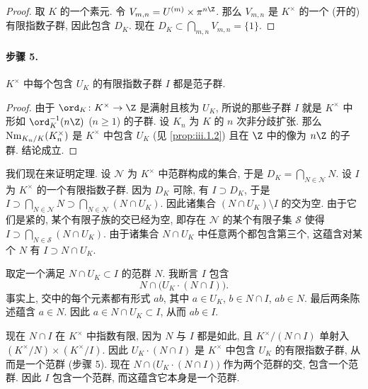 \begin{proof}
取 $K$ 的一个素元. 令 $V_{m,n}=U^{(m)}\times\pi^{n\Z}$. 那么 $V_{m,n}$ 是 $K^\times$ 的一个 (开的) 有限指数子群, 因此包含 $D_K$. 现在 $D_K\subset\bigcap_{m,n}V_{m,n}=\{1\}$.
\end{proof}

\paragraph*{步骤 5.} $K^\times$ 中每个包含 $U_K$ 的有限指数子群 $I$ 都是范子群.

\begin{proof}
由于 $\ord_K\colon K^\times\to\Z$ 是满射且核为 $U_K$, 所说的那些子群 $I$ 就是 $K^\times$ 中形如 $\ord_K^{-1}(n\Z)$ ($n\ge 1$) 的子群. 设 $K_n$ 为 $K$ 的 $n$ 次非分歧扩张. 那么 $\operatorname{Nm}_{K_n/K}(K_n^\times)$ 是 $K^\times$ 中包含 $U_K$ (见 \ref{prop:iii.1.2}) 且在 $\Z$ 中的像为 $n\Z$ 的子群. 结论成立.
\end{proof}

我们现在来证明定理. 设 $\mathcal{N}$ 为 $K^\times$ 中范群构成的集合, 于是 $D_K=\bigcap_{N\in\mathcal{N}}N$. 设 $I$ 为 $K^\times$ 的一个有限指数子群. 因为 $D_K$ 可除, 有 $I\supset D_K$, 于是 $I\supset\bigcap_{N\in\mathcal{N}}N\supset\bigcap_{N\in\mathcal{N}}(N\cap U_K)$. 因此诸集合 $(N\cap U_K)\setminus I$ 的交为空. 由于它们是紧的, 某个有限子族的交已经为空, 即存在 $\mathcal{N}$ 的某个有限子集 $\mathcal{S}$ 使得 $I\supset\bigcap_{N\in\mathcal{S}}(N\cap U_K)$. 由于诸集合 $N\cap U_K$ 中任意两个都包含第三个, 这蕴含对某个 $N$ 有 $I\supset N\cap U_K$.

取定一个满足 $N\cap U_K\subset I$ 的范群 $N$. 我断言 $I$ 包含
\[
 N\cap\bigl(U_K\cdot(N\cap I)\bigr).
\]
事实上, 交中的每个元素都有形式 $ab$, 其中 $a\in U_K$, $b\in N\cap I$, $ab\in N$. 最后两条陈述蕴含 $a\in N$. 因此 $a\in N\cap U_K\subset I$, 从而 $ab\in I$.

现在 $N\cap I$ 在 $K^\times$ 中指数有限, 因为 $N$ 与 $I$ 都是如此, 且 $K^\times/(N\cap I)$ 单射入 $(K^\times/N)\times(K^\times/I)$. 因此 $U_K\cdot(N\cap I)$ 是 $K^\times$ 中包含 $U_K$ 的有限指数子群, 从而是一个范群 (步骤 5). 现在 $N\cap\bigl(U_K\cdot(N\cap I)\bigr)$ 作为两个范群的交, 包含一个范群. 因此 $I$ 包含一个范群, 而这蕴含它本身是一个范群.

